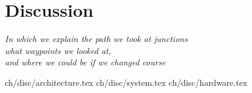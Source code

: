 \chapter{Discussion}\label{ch:disc}

\begin{flushright}{\slshape
    In which we explain the path we took at junctions\\
    what waypoints we looked at,\\
    and where we could be if we changed course
}
\end{flushright}

 {ch/disc/architecture.tex}
 {ch/disc/system.tex}
 {ch/disc/hardware.tex}


